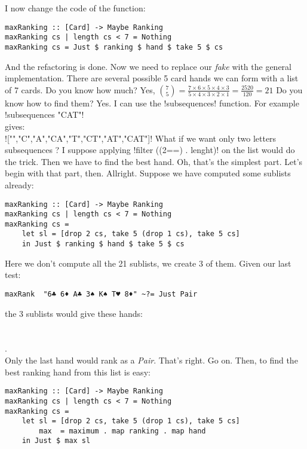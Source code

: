 \lhA \error I now change the code of the function:
\begin{lstlisting}[frame=single]
maxRanking :: [Card] -> Maybe Ranking
maxRanking cs | length cs < 7 = Nothing
maxRanking cs = Just $ ranking $ hand $ take 5 $ cs
\end{lstlisting}
\success And the refactoring is done. Now we need to replace our \emph{fake} with the general implementation.
\lhN There are several possible 5 card hands we can form with a list of 7 cards. Do you know how much?
\lhA Yes, ${{7}\choose{5}} = \frac{7\times6 \times 5 \times 4 \times 3}{5 \times 4 \times 3 \times 2 \times 1} = \frac{2520}{120} = 21$
\lhN Do you know how to find them?
\lhA Yes. I can use the \il!subsequences! function. For example\\ 
\il!subsequences "CAT"! \\
gives: \\
\il!["","C","A","CA","T","CT","AT","CAT"]!
\lhN What if we want only two letters subsequences ?
\lhA I suppose applying \il!filter ((2==) . lenght)! on the list would do the trick.
\lhN Then we have to find the best hand.
\lhA Oh, that's the simplest part.
\lhN Let's begin with that part, then.
\lhA Allright. Suppose we have computed some sublists already:
\begin{lstlisting}[frame=single]
maxRanking :: [Card] -> Maybe Ranking
maxRanking cs | length cs < 7 = Nothing
maxRanking cs = 
    let sl = [drop 2 cs, take 5 (drop 1 cs), take 5 cs]
    in Just $ ranking $ hand $ take 5 $ cs
\end{lstlisting}
\success Here we don't compute all the 21 sublists, we create 3 of them. 
\lhN Given our last test:
\begin{lstlisting}[frame=single]
maxRank  "6♣ 6♦ A♣ 3♠ K♠ T♥ 8♦" ~?= Just Pair
\end{lstlisting}
the 3 sublists would give these hands: \\     \\ 
      \\
    . \\
Only the last hand would rank as a \emph{Pair}.
\lhA That's right.
\lhN Go on.
\lhA Then, to find the best ranking hand from this list is easy:
\begin{lstlisting}[frame=single]
maxRanking :: [Card] -> Maybe Ranking
maxRanking cs | length cs < 7 = Nothing
maxRanking cs = 
    let sl = [drop 2 cs, take 5 (drop 1 cs), take 5 cs]
        max  = maximum . map ranking . map hand
    in Just $ max sl
\end{lstlisting} %

